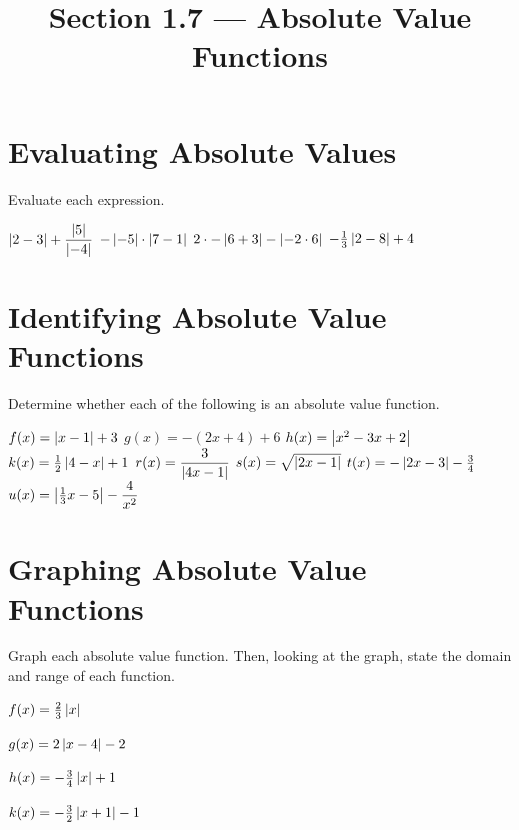 

\title{Section 1.7 --- Absolute Value Functions}


\maketitle

\section*{Evaluating Absolute Values}
Evaluate each expression.
\begin{smenum}
\mitemxx
{$\left|2-3\right|+\dfrac{\left|5\right|}{\left|-4\right|}$}
{$-\left|-5\right|\cdot\left|7-1\right|$}
\mitemxx
{$2\cdot-\left|6+3\right|-\left|-2\cdot 6\right|$}
{$-\frac{1}{3}\left|2-8\right|+4$}
\end{smenum}

\section*{Identifying Absolute Value Functions}
Determine whether each of the following is an absolute value function.
\begin{smenum}
\mitemxxxx
{$f(x)=\left|x-1\right|+3$}
{$g(x)=-(2x+4)+6$}
{$h(x)=\left|x^2-3x+2\right|$}
{$k(x)=\frac{1}{2}\left|4-x\right|+1$}
\mitemxxxx
{$r(x)=\dfrac{3}{\left|4x-1\right|}$}
{$s(x)=\sqrt{\left|2x-1\right|}$}
{$t(x)=-\left|2x-3\right|-\frac{3}{4}$}
{$u(x)=\left|\frac{1}{3}x-5\right|-\dfrac{4}{x^2}$}
\end{smenum}

\section*{Graphing Absolute Value Functions}
Graph each absolute value function. Then, looking at the graph, state the domain and range of each function.
\begin{smenum}
\mitemxx
{$f(x)=\frac{2}{3}\left|x\right|$\\
\begin{ilpic}[x=0.2in,y=0.2in]
\DrawGridSquare
\end{ilpic}}
{$g(x)=2\left|x-4\right|-2$\\
\begin{ilpic}[x=0.2in,y=0.2in]
\DrawGridSquare
\end{ilpic}}
\mitemxx
{$h(x)=-\frac{3}{4}\left|x\right|+1$\\
\begin{ilpic}[x=0.2in,y=0.2in]
\DrawGridSquare
\end{ilpic}}
{$k(x)=-\frac{3}{2}\left|x+1\right|-1$\\
\begin{ilpic}[x=0.2in,y=0.2in]
\DrawGridSquare
\end{ilpic}}
\end{smenum}

